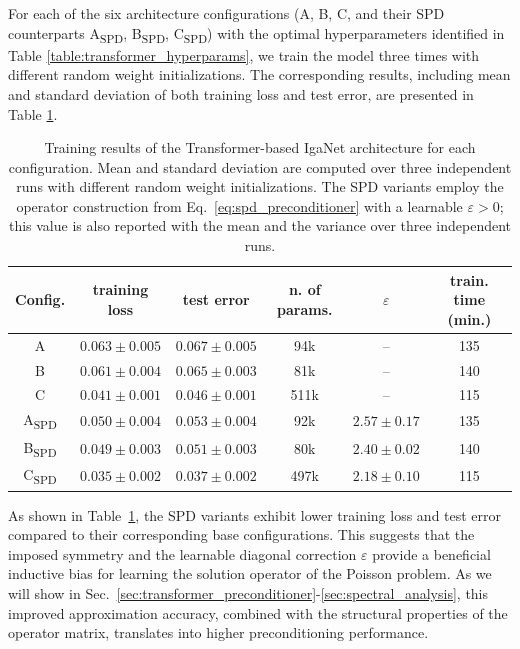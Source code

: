 \documentclass{article}
\newcommand{\Dlat}{d_v} %
\theoremstyle{plain}
\numberwithin{equation}{section}
\begin{document}
For each of the six architecture configurations (A, B, C, and their SPD counterparts A\textsubscript{SPD}, B\textsubscript{SPD}, C\textsubscript{SPD}) with the optimal hyperparameters identified in Table \ref{table:transformer_hyperparams}, we train the model three times with different random weight initializations. The corresponding results, including mean and standard deviation of both training loss and test error, are presented in Table \ref{table:transformer_results}.

\begin{table}[!ht]
    \centering
    \begin{tabular}{cccccc}
        \toprule
        Config.        & training loss      & test error         & n. of params. & $\varepsilon$ & train. time (min.) \\
        \midrule
        A                    & $0.063 \pm 0.005$  & $0.067 \pm 0.005$  & 94k & --          & 135                  \\
        B                    & $0.061 \pm 0.004$  & $0.065 \pm 0.003$  & 81k & --          & 140                  \\
        C                    & $0.041 \pm 0.001$  & $0.046 \pm 0.001$  & 511k & --         & 115                  \\
        \midrule
        A\textsubscript{SPD} & $0.050 \pm 0.004 $ & $0.053 \pm 0.004 $ & 92k & $2.57 \pm 0.17$         & 135                  \\
        B\textsubscript{SPD} & $0.049 \pm 0.003 $ & $0.051 \pm 0.003 $ & 80k & $2.40 \pm 0.02$          & 140                  \\
        C\textsubscript{SPD} & $0.035 \pm 0.002 $ & $0.037 \pm 0.002 $ & 497k & $2.18 \pm 0.10$         & 115                  \\
        \bottomrule
    \end{tabular}
    \caption{Training results of the Transformer-based IgaNet architecture for each configuration. Mean and standard deviation are computed over three independent runs with different random weight initializations. The SPD variants employ the operator construction from Eq.~\eqref{eq:spd_preconditioner} with a learnable $\varepsilon > 0$; this value is also reported with the mean and the variance over three independent runs.}
    \label{table:transformer_results}
\end{table}
As shown in Table~\ref{table:transformer_results}, the SPD variants exhibit lower training loss and test error compared to their corresponding base configurations. This suggests that the imposed symmetry and the learnable diagonal correction $\varepsilon$ provide a beneficial inductive bias for learning the solution operator of the Poisson problem. As we will show in Sec.~\ref{sec:transformer_preconditioner}-\ref{sec:spectral_analysis}, this improved approximation accuracy, combined with the structural properties of the operator matrix, translates into higher preconditioning performance.
\end{document}
